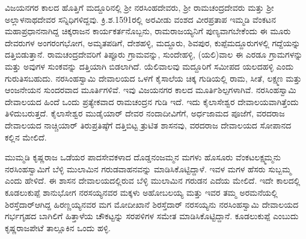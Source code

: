 \vskip -2pt

ವಿಜಯನಗರ ಕಾಲದ ಹೊತ್ತಿಗೆ ಮದ್ದೂರಿನಲ್ಲಿ ಶ‍್ರೀ ನರಸಿಂಹದೇವರು, ಶ‍್ರೀ ರಾಮಚಂದ್ರದೇವರು ಮತ್ತು ಶ‍್ರೀ ಅಲ್ಲಾಳನಾಥದೇವರ ಸನ್ನಿಧಿಗಳಿದ್ದವು. ಕ್ರಿ.ಶ.1591ರಲ್ಲಿ ಅರವೀಡು ವಂಶದ ವೀರಪ್ರತಾಪ ಇಮ್ಮಡಿ ವೆಂಕಟನ ಮಹಾಪ್ರಧಾನನಾಗಿದ್ದ ಚಿಕ್ಕರಾಜನ ಕಾರ್ಯಕರ್ತನೊಬ್ಬನು, ರಾಮರಾಜಯ್ಯನಿಗೆ ಪುಣ್ಯವಾಗಬೇಕೆಂದು ಈ ಮೂರು ದೇವರು\-ಗಳ ಅಂಗರಂಗಭೋಗ, ಅಮೃತಪಡಿಗೆ, ದೇಶಹಳ್ಳಿ, ಮದ್ದೂರು, ಶಿವಪುರ, ಕುಪ್ಪೆಮದ್ದೂರುಗಳಲ್ಲಿ ಗದ್ದೆಯನ್ನು ದತ್ತಿಬಿಡುತ್ತಾನೆ. ರಾಮಚಂದ್ರದೇವರಿಗೆ ತಿಪ್ಪೂರು ಗ್ರಾಮವನ್ನು, ಸುಂದೇಹಳ್ಳಿ, (ಯಲಿ)ವಾಲ ಈ ಎರಡೂ ಗ್ರಾಮಗಳನ್ನು ಮತ್ತು ಅವುಗಳ ಸುಂಕವನ್ನು ದತ್ತಿಯಾಗಿ ಬಿಡಲಾಗಿದೆ. ಯೆಲಿವಾಲವು ಮದ್ದೂರಿಗೆ ಸಮೀಪದ ಯಲದಹಳ್ಳಿ ಎಂದು ಗುರುತಿಸಬಹುದು. ನರಸಿಂಹಸ್ವಾಮಿ ದೇವಾಲಯದ ಒಳಗೆ ಕೈಸಾಲೆಯ ಚಿಕ್ಕ ಗುಡಿಯಲ್ಲಿ ರಾಮ, ಸೀತೆ, ಲಕ್ಷ್ಮಣ ಮತ್ತು ಆಂಜನೇಯನ ಸುಂದರವಾದ ಮೂರ್ತಿಗಳಿವೆ. ಇವು ವಿಜಯನಗರ ಕಾಲದ ಮೂರ್ತಿಶಿಲ್ಪಗಳಾಗಿವೆ. ನರಸಿಂಹಸ್ವಾಮಿ ದೇವಾಲಯದ ಹಿಂದೆ ಒಂದು ಪ್ರತ್ಯೇಕವಾದ ರಾಮಚಂದ್ರನ ಗುಡಿ ಇದೆ. ಇದು ಕೈಲಾಸೇಶ್ವರ ದೇವಾಲಯ\-ವಾಗಿತ್ತೆಂದು ತಿಳಿದುಬರುತ್ತದೆ. ಕೈಲಾಸೇಶ್ವರ ಮುಡೈಯಾರ್​ ದೇವರ ನಂದಾದೀವಿಗೆಗೆ, ಅರ್ಧಜಾಮದ ಪೂಜೆಗೆ, ವರದರಾಜ ದೇವಾಲಯದ ನಾಚ್ಚಿಯಾರ್​ ತಿರುಪ್ರತಿಷ್ಠೆಗೆ ದತ್ತಿಬಿಟ್ಟ ತ್ರುಟಿತ ಶಾಸನವು, ವರದರಾಜ ದೇವಾಲಯದ ಸೋಪಾನದ ಕಲ್ಲಿನ ಮೇಲಿದೆ.

\vskip -2pt

ಮುಮ್ಮಡಿ ಕೃಷ್ಣರಾಜ ಒಡೆಯರ ಪಾದಸೇವಕಳಾದ ದೊಡ್ಡನಂಜಮ್ಮನ ಮಗಳು ಹೊಸೂರು ವೆಂಕಟಲಕ್ಷ್ಮಮ್ಮನು ನರಸಿಂಹಸ್ವಾಮಿಗೆ ಬೆಳ್ಳಿ ಮುಲಾಮಿನ ಗರುಡವಾಹನವನ್ನು ಮಾಡಿಸಿಕೊಟ್ಟಿದ್ದಾಳೆ. ಇವಳ ಮಗಳ ಹೆಸರು ಸುಬ್ಬಮ್ಮ ಎಂದು ಹೇಳಿದೆ. ಈ ಶಾಸನ ದೇವಾಲಯದಲ್ಲಿರುವ ಬೆಳ್ಳಿ ಮುಲಾಮಿನ ಗರುಡನ ಎದೆಯ ಮೇಲಿದೆ. ಇದೇ ಕಾಲದಲ್ಲಿ ಕೂಡಲುಕುಪ್ಪೆ ಶಾನುಭೋಗ ನರಸಯ್ಯನವರ ಮಕ್ಕಳು ಅಹೋಬಲಯ್ಯ ಮತ್ತು ಇವರ ತಮ್ಮ ಅರಮನೆಯಲ್ಲಿ ಶಿರಸ್ತೆದಾರ್​ ಆಗಿದ್ದ ಹಿರಣ್ಣಯ್ಯನವರ ಮಗ ಮೋದೀಖಾನೆ ಶಿರಸ್ತೆದಾರ್​ ನರಸಯ್ಯನು ನರಸಿಂಹಸ್ವಾಮಿ ದೇವಾಲಯದ ಗರ್ಭಗೃಹದ ಬಾಗಿಲಿಗೆ ಹಿತ್ತಾಳೆಯ ಚೌಕಟ್ಟನ್ನು ಸರಪಳಿಗಳ ಸಮೇತ ಮಾಡಿಸಿಕೊಟ್ಟಿದ್ದಾನೆ. ಕೂಡಲುಕುಪ್ಪೆ ಎಂಬುದು ಕೃಷ್ಣರಾಜಪೇಟೆ ತಾಲ್ಲೂಕಿನ ಒಂದು ಹಳ್ಳಿ.

